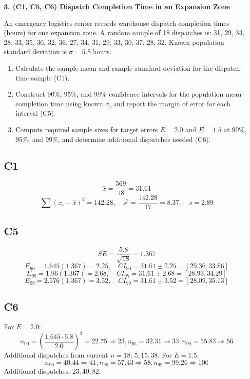 \begin{ExamProblems}
		\newpage
		\item
		\textbf{3. (C1, C5, C6) Dispatch Completion Time in an Expansion Zone}
		
		An emergency logistics center records warehouse dispatch completion times (hours) for one expansion zone.
		A random sample of 18 dispatches is:
		31, 29, 34, 28, 33, 35, 30, 32, 36, 27, 34, 31, 29, 33, 30, 37, 28, 32.
		Known population standard deviation is $\sigma=5.8$ hours.
		\begin{enumerate}
			\item Calculate the sample mean and sample standard deviation for the dispatch-time sample (C1).
			\item Construct 90\%, 95\%, and 99\% confidence intervals for the population mean completion time using known $\sigma$, and report the margin of error for each interval (C5).
			\item Compute required sample sizes for target errors $E=2.0$ and $E=1.5$ at 90\%, 95\%, and 99\%, and determine additional dispatches needed (C6).
		\end{enumerate}
		
		\subsection*{C1}
		\[
		\bar{x}=\frac{569}{18}=31.61
		\]
		\[
		\sum (x_i-\bar{x})^2=142.28,
		\quad s^2=\frac{142.28}{17}=8.37,
		\quad s=2.89
		\]
		
		\subsection*{C5}
		\[
		SE=\frac{5.8}{\sqrt{18}}=1.367
		\]
		\[
		E_{90}=1.645(1.367)=2.25,\quad CI_{90}=31.61\pm2.25=[29.36,33.86]
		\]
		\[
		E_{95}=1.96(1.367)=2.68,\quad CI_{95}=31.61\pm2.68=[28.93,34.29]
		\]
		\[
		E_{99}=2.576(1.367)=3.52,\quad CI_{99}=31.61\pm3.52=[28.09,35.13]
		\]
		
		\subsection*{C6}
		For $E=2.0$:
		\[
		n_{90}=\left(\frac{1.645\cdot5.8}{2.0}\right)^2=22.75\Rightarrow23,
		n_{95}=32.31\Rightarrow33,
		n_{99}=55.83\Rightarrow56
		\]
		Additional dispatches from current $n=18$: $5,15,38$.
		For $E=1.5$:
		\[
		n_{90}=40.44\Rightarrow41,
		n_{95}=57.43\Rightarrow58,
		n_{99}=99.26\Rightarrow100
		\]
		Additional dispatches: $23,40,82$.
		

\end{ExamProblems}
